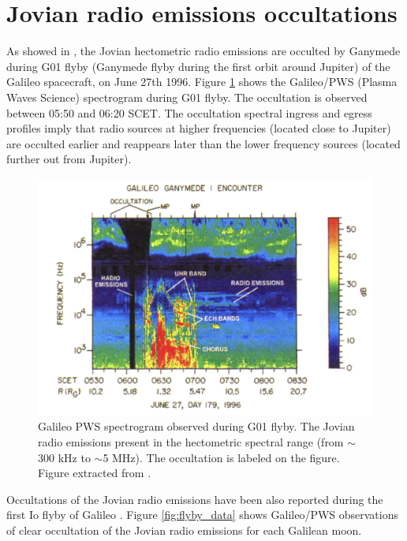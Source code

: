 \documentclass[referee]{aa}
\begin{document}

\section{Jovian radio emissions occultations}

As showed in \citet{Kurth:1997in}, the Jovian hectometric radio emissions are occulted by Ganymede during G01 flyby (Ganymede flyby during the first orbit around Jupiter) of the Galileo spacecraft, on June 27th 1996. Figure \ref{fig:g01} shows the Galileo/PWS (Plasma Waves Science) \citep{gurnett_SSR_92} spectrogram during G01 flyby. The occultation is observed between 05:50 and 06:20 SCET. The occultation spectral ingress and egress profiles imply that radio sources at higher frequencies (located close to Jupiter) are occulted earlier and reappears later than the lower frequency sources (located further out from Jupiter).

\begin{figure}
\includegraphics[width=\linewidth]{gll-G01-Kurth97.png}
\caption{Galileo PWS spectrogram observed during G01 flyby. The Jovian radio emissions present in the hectometric spectral range (from $\sim$300 kHz to $\sim$5 MHz). The occultation is labeled on the figure. Figure extracted from \citet{Kurth:1997in}.}\label{fig:g01}
\end{figure}

Occultations of the Jovian radio emissions have been also reported during the first Io flyby of Galileo \citep{louarn_GRL_97}. Figure \ref{fig:flyby_data} shows  Galileo/PWS observations of clear occultation of the Jovian radio emissions for each Galilean moon.
\end{document}
